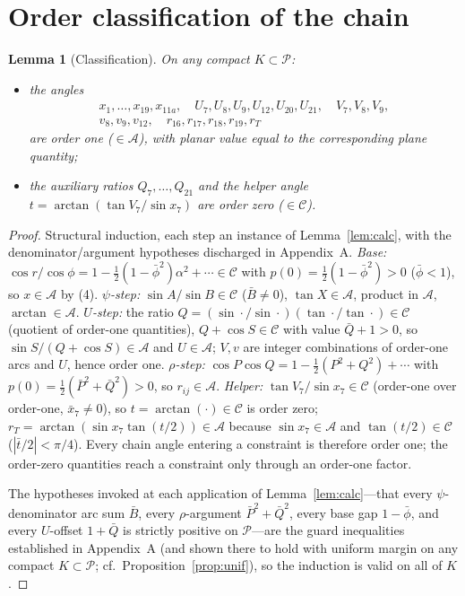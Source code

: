 \documentclass[pdflatex,sn-mathphys-num]{sn-jnl}
\theoremstyle{thmstyleone}%
\newtheorem{lemma}{Lemma}%
\theoremstyle{thmstyletwo}%
\theoremstyle{thmstylethree}%
\begin{document}
\section{Order classification of the chain}
\begin{lemma}[Classification]\label{lem:chain}
On any compact $K\subset\mathcal P$:
\begin{itemize}\itemsep1pt
\item[\textup{(i)}] the angles
\[
\begin{gathered}
x_1,\dots,x_{19},x_{11a},\quad
U_7,U_8,U_9,U_{12},U_{20},U_{21},\quad
V_7,V_8,V_9,\\
v_8,v_9,v_{12},\quad r_{16},r_{17},r_{18},r_{19},r_T
\end{gathered}
\]
are order one ($\in\mathcal A$), with planar value equal to the corresponding plane quantity;
\item[\textup{(ii)}] the auxiliary ratios $Q_7,\dots,Q_{21}$ and the helper angle
$t=\arctan(\tan V_7/\sin x_7)$ are order zero ($\in\mathcal C$).
\end{itemize}
\end{lemma}
\begin{proof}
Structural induction, each step an instance of Lemma~\ref{lem:calc}, with the
denominator/argument hypotheses discharged in Appendix~A. \emph{Base:}
$\cos r/\cos\phi=1-\tfrac12(1-\bar\phi^2)\alpha^2+\cdots\in\mathcal C$ with
$p(0)=\tfrac12(1-\bar\phi^2)>0$ ($\bar\phi<1$), so $x\in\mathcal A$ by (4).
\emph{$\psi$-step:} $\sin A/\sin B\in\mathcal C$ ($\bar B\neq0$), $\tan X\in\mathcal A$, product in $\mathcal A$, $\arctan\in\mathcal A$. \emph{$U$-step:} the ratio $Q=(\sin\cdot/\sin\cdot)(\tan\cdot/\tan\cdot)\in\mathcal C$ (quotient of order-one quantities), $Q+\cos S\in\mathcal C$ with value $\bar Q+1>0$, so $\sin S/(Q+\cos S)\in\mathcal A$ and $U\in\mathcal A$; $V,v$ are integer combinations of order-one arcs and $U$, hence order one. \emph{$\rho$-step:} $\cos P\cos Q=1-\tfrac12(P^2+Q^2)+\cdots$ with $p(0)=\tfrac12(\bar P^2+\bar Q^2)>0$, so $r_{ij}\in\mathcal A$. \emph{Helper:} $\tan V_7/\sin x_7\in\mathcal C$ (order-one over order-one, $\bar x_7\neq0$), so $t=\arctan(\cdot)\in\mathcal C$ is order zero; $r_T=\arctan(\sin x_7\tan(t/2))\in\mathcal A$ because $\sin x_7\in\mathcal A$ and $\tan(t/2)\in\mathcal C$ ($|\bar t/2|<\pi/4$). Every chain angle entering a constraint is therefore order one; the order-zero quantities reach a constraint only through an order-one factor.

The hypotheses invoked at each application of Lemma~\ref{lem:calc}---that every
$\psi$-denominator arc sum $\bar B$, every $\rho$-argument $\bar P^2+\bar Q^2$, every base gap $1-\bar\phi$, and every $U$-offset $1+\bar Q$ is strictly positive on $\mathcal P$---are the guard inequalities established in Appendix~A (and shown there to hold with uniform margin on any compact $K\subset\mathcal P$; cf.\ Proposition~\ref{prop:unif}), so the induction is valid on all
of $K$.
\end{proof}
\end{document}
